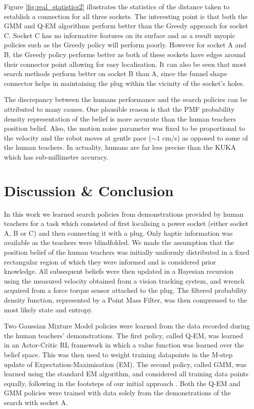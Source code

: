 \documentclass[final,3p,times,twocolumn]{elsarticle}
\begin{document}
Figure \ref{fig:real_statistics2} illustrates the statistics of the distance taken to establish a connection for all three sockets. 
The interesting point is that both the GMM and Q-EM algorithms perform better than the Greedy approach for socket C. Socket C has no informative 
features on its surface and as a result myopic policies such as the Greedy policy will perform poorly. However for socket A 
and B, the Greedy policy performs better as both of these sockets have edges around their connector point allowing for easy localisation. 
It can also be seen that most search methods perform better on socket B than A, since the funnel shape connector helps in maintaining the plug 
within the vicinity of the socket's holes. 


The discrepancy between the humans performance and the search policies can be attributed to many causes. One plausible reason is 
that the PMF probability density representation of the belief is more accurate than the human teachers position belief. 
Also, the motion noise parameter was fixed to be proportional to the velocity and the robot moves at gentle pace ($\sim1$ cm/s) as 
opposed to some of the human teachers. In actuality, humans are far less precise than the KUKA which has sub-millimetre accuracy.

\section{Discussion \& Conclusion}\label{sec:conclusion}

In this work we learned search policies from demonstrations provided by human teachers for a task
which consisted of first localising a power socket (either socket A, B or C) and then connecting it with a plug. Only haptic information 
was available as the teachers were blindfolded. We made the assumption that the position belief of the human teachers 
was initially uniformly distributed in a fixed rectangular region of which they were 
informed and is considered prior knowledge. All subsequent beliefs were then updated in a Bayesian recursion 
using the measured velocity obtained from a vision tracking system, and wrench acquired from a force torque sensor attached 
to the plug. The filtered probability density function, represented by a Point Mass Filter, was then compressed to the 
most likely state and entropy.

Two Gaussian Mixture Model policies were learned from the data recorded during the human teachers' demonstrations. 
The first policy, called Q-EM, was learned in an Actor-Critic RL framework in which a value function was learned over 
the belief space. This was then used to weight training datapoints in the M-step update of Expectation-Maximisation (EM). The second 
policy, called GMM, was learned using the standard EM algorithm, and considered all training data points equally,
following in the footsteps of our initial approach \cite{Chambrier2014}. Both the Q-EM and GMM policies were trained 
with data solely from the demonstrations of the search with socket A.
\end{document}
